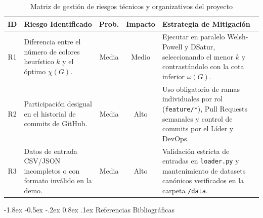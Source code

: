 \documentclass[12pt,a4paper]{article}
\makeatletter
\renewcommand\section{\@startsection {section}{1}{\z@}%
                                   {-1.8ex \@plus -0.5ex \@minus -.2ex}%
                                   {0.8ex \@plus.1ex}%
                                   {\normalfont\large\bfseries}}
\theoremstyle{definition}
\makeatother
\begin{document}
\begin{singlespace}
\begin{table}[H]
\centering
\caption{Matriz de gestión de riesgos técnicos y organizativos del proyecto}
\label{tab:riesgos}
\scriptsize
\setlength{\tabcolsep}{3.5pt}
\renewcommand{\arraystretch}{1.18}
\begin{tabularx}{\textwidth}{|c|L{3.6cm}|c|c|Y|}
\hline
{}
\textbf{ID} & \textbf{Riesgo Identificado} & \textbf{Prob.} & \textbf{Impacto} & \textbf{Estrategia de Mitigación} \\ \hline
R1 & Diferencia entre el número de colores heurístico $k$ y el óptimo $\chi(G)$. & Media & Medio & Ejecutar en paralelo Welsh-Powell y DSatur, seleccionando el menor $k$ y contrastándolo con la cota inferior $\omega(G)$. \\ \hline
R2 & Participación desigual en el historial de commits de GitHub. & Media & Alto & Uso obligatorio de ramas individuales por rol (\texttt{feature/*}), Pull Requests semanales y control de commits por el Líder y DevOps. \\ \hline
R3 & Datos de entrada CSV/JSON incompletos o con formato inválido en la demo. & Media & Alto & Validación estricta de entradas en \texttt{loader.py} y mantenimiento de datasets canónicos verificados en la carpeta \texttt{/data}. \\ \hline
\end{tabularx}
\end{table}
\end{singlespace}

\FloatBarrier

\section{Referencias Bibliográficas}
\end{document}

